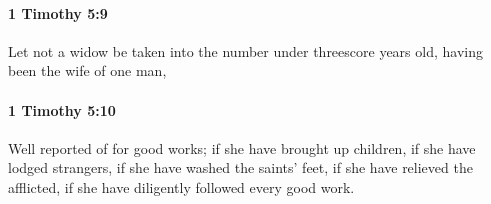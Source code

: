 		\paragraph{1 Timothy 5:9} %
			\label{1TIMOTHY-5-9}

			Let not a widow be taken into the number under threescore years old, having been the wife of one man,

			\begin{framed}
			\scriptsize
				\begin{compactdesc}
					\item[SBLG] 
				\end{compactdesc}
			\end{framed}

		\paragraph{1 Timothy 5:10} %
			\label{1TIMOTHY-5-10}

			Well reported of for good works; if she have brought up children, if she have lodged strangers, if she have washed the saints' feet, if she have relieved the afflicted, if she have diligently followed every good work.

